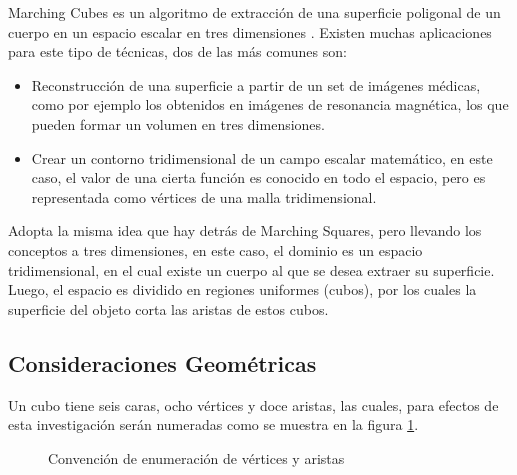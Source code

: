 Marching Cubes es un algoritmo de extracción de una superficie poligonal de un cuerpo
en un espacio escalar en tres dimensiones \cite{Lorensen87marchingcubes}. Existen muchas aplicaciones para este tipo de técnicas,
dos de las más comunes son:

\begin{itemize}
	\item Reconstrucción de una superficie a partir de un set de imágenes médicas, como
	por ejemplo los obtenidos en imágenes de resonancia magnética, los que pueden formar
	un volumen en tres dimensiones.

	\item Crear un contorno tridimensional de un campo escalar matemático, en este caso,
	el valor de una cierta función es conocido en todo el espacio, pero es representada como
	vértices de una malla tridimensional.
\end{itemize}

Adopta la misma idea que hay detrás de Marching Squares, pero llevando los conceptos a
tres dimensiones, en este caso, el dominio es un espacio tridimensional, en el cual existe un
cuerpo al que se desea extraer su superficie. Luego, el espacio es dividido en regiones uniformes
(cubos), por los cuales la superficie del objeto corta las aristas de estos cubos.

\newpage
\subsection{Consideraciones Geométricas}
\label{subsec:marchingCubes:consideracionesGeometricas}

Un cubo tiene seis caras, ocho vértices y doce aristas, las cuales, para efectos de esta
investigación serán numeradas como se muestra en la figura \ref{f:estadoDelArte:convention}.

\begin{figure}[hbp]
\centering
\caption{Convención de enumeración de vértices y aristas}
\label{f:estadoDelArte:convention}
\end{figure}

